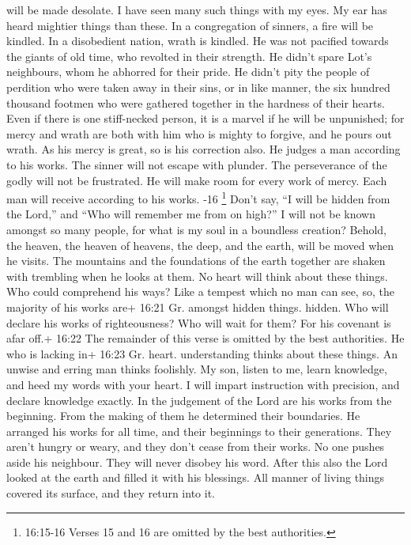 will be made desolate.  I have seen many such things with my
eyes. My ear has heard mightier things than these.  In a
congregation of sinners, a fire will be kindled. In a disobedient
nation, wrath is kindled.  He was not pacified towards the
giants of old time, who revolted in their strength.  He
didn't spare Lot's neighbours, whom he abhorred for their pride.
 He didn't pity the people of perdition who were taken away
in their sins,  or in like manner, the six hundred thousand
footmen who were gathered together in the hardness of their hearts.
 Even if there is one stiff-necked person, it is a marvel
if he will be unpunished; for mercy and wrath are both with him who is
mighty to forgive, and he pours out wrath.  As his mercy is
great, so is his correction also. He judges a man according to his
works.  The sinner will not escape with plunder. The
perseverance of the godly will not be frustrated.  He will
make room for every work of mercy. Each man will receive according to
his works. -16 \footnote{16:15-16 Verses 15 and 16 are
  omitted by the best authorities.}  Don't say, ``I will be
hidden from the Lord,'' and ``Who will remember me from on high?'' I
will not be known amongst so many people, for what is my soul in a
boundless creation?  Behold, the heaven, the heaven of
heavens, the deep, and the earth, will be moved when he visits.
 The mountains and the foundations of the earth together
are shaken with trembling when he looks at them.  No heart
will think about these things. Who could comprehend his ways?
 Like a tempest which no man can see, so, the majority of
his works are+ 16:21 Gr. amongst hidden things. hidden. 
Who will declare his works of righteousness? Who will wait for them? For
his covenant is afar off.+ 16:22 The remainder of this verse is omitted
by the best authorities.  He who is lacking in+ 16:23 Gr.
heart. understanding thinks about these things. An unwise and erring man
thinks foolishly.  My son, listen to me, learn knowledge,
and heed my words with your heart.  I will impart
instruction with precision, and declare knowledge exactly. 
In the judgement of the Lord are his works from the beginning. From the
making of them he determined their boundaries.  He arranged
his works for all time, and their beginnings to their generations. They
aren't hungry or weary, and they don't cease from their works.
 No one pushes aside his neighbour. They will never disobey
his word.  After this also the Lord looked at the earth and
filled it with his blessings.  All manner of living things
covered its surface, and they return into it.

